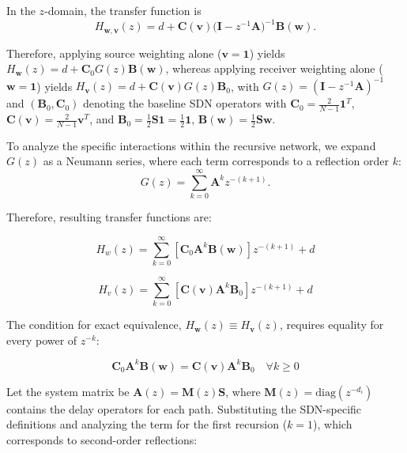 \documentclass[conference]{IEEEtran}
\begin{document}
In the $z$-domain, the transfer function is
\begin{equation}
H_{\mathbf{w},\mathbf{v}}(z)
= d + \mathbf{C}(\mathbf{v})\big(\mathbf{I}-z^{-1}\mathbf{A}\big)^{-1}\mathbf{B}(\mathbf{w}).
\end{equation}

Therefore, applying source weighting alone ($\mathbf{v}=\mathbf{1}$) yields
$H_{\mathbf{w}}(z)=d+\mathbf{C}_0 G(z)\mathbf{B}(\mathbf{w})$,
whereas applying receiver weighting alone ($\mathbf{w}=\mathbf{1}$) yields
$H_{\mathbf{v}}(z)=d+\mathbf{C}(\mathbf{v}) G(z)\mathbf{B}_0$,
with $G(z)=(\mathbf{I}-z^{-1}\mathbf{A})^{-1}$ and $(\mathbf{B}_0,\mathbf{C}_0)$ denoting the baseline SDN operators with $\mathbf{C}_0 = \frac{2}{N-1}\mathbf{1}^T$, $\mathbf{C}(\mathbf{v}) = \frac{2}{N-1}\mathbf{v}^T$, and $\mathbf{B}_0 = \frac{1}{2}\mathbf{S}\mathbf{1} = \frac{1}{2}\mathbf{1}$, $\mathbf{B}(\mathbf{w}) = \frac{1}{2}\mathbf{S}\mathbf{w}$.

To analyze the specific interactions within the recursive network, we expand $G(z)$ as a Neumann series, where each term corresponds to a reflection order $k$:\begin{equation}G(z) = \sum_{k=0}^{\infty} \mathbf{A}^k z^{-(k+1)}.\end{equation}

Therefore, resulting transfer functions are:

\begin{equation}H_{w}(z) = \sum_{k=0}^{\infty} \left[ \mathbf{C}_0 \mathbf{A}^k \mathbf{B}(\mathbf{w}) \right] z^{-(k+1)} + d\end{equation}

\begin{equation}H_{v}(z) = \sum_{k=0}^{\infty} \left[ \mathbf{C}(\mathbf{v}) \mathbf{A}^k \mathbf{B}_0 \right] z^{-(k+1)} + d\end{equation}

The condition for exact equivalence, $H_{\mathbf{w}}(z) \equiv H_{\mathbf{v}}(z)$, requires equality for every power of $z^{-k}$:

\begin{equation}\mathbf{C}_0 \mathbf{A}^k \mathbf{B}(\mathbf{w}) = \mathbf{C}(\mathbf{v}) \mathbf{A}^k \mathbf{B}_0 \quad \forall k \geq 0\end{equation}



Let the system matrix be $\mathbf{A}(z) = \mathbf{M}(z)\mathbf{S}$, where $\mathbf{M}(z) = \text{diag}(z^{-d_i})$ contains the delay operators for each path. Substituting the SDN-specific definitions and analyzing the term for the first recursion ($k=1$), which corresponds to second-order reflections:
\end{document}
